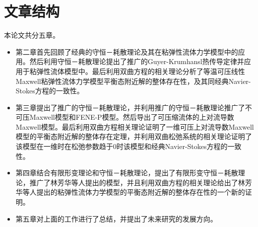 \section{文章结构}
本论文共分五章。
\begin{itemize}
\item 第二章首先回顾了经典的守恒－耗散理论及其在粘弹性流体力学模型中的应用。然后利用守恒－耗散理论提出了推广的Guyer-Krumhansl热传导定律并应用于粘弹性流体模型中。最后利用双曲方程的相关理论分析了等温可压线性Maxwell粘弹性流体力学模型平衡态附近解的整体存在性，及其同经典Navier-Stokes方程的一致性。
\item 第三章提出了推广的守恒－耗散理论，并利用推广的守恒－耗散理论推广了不可压Maxwell模型和FENE-P模型。然后导出了可压缩流体的上对流导数Maxwell模型。最后利用双曲方程相关理论证明了一维可压上对流导数Maxwell模型的平衡态附近解的整体存在定理，并利用双曲松弛系统的相关理论证明了该模型在一维时在松弛参数趋于$0$时该模型和经典Navier-Stokes方程的一致性。
\item 第四章结合有限形变理论和守恒－耗散理论，提出了有限形变守恒－耗散理论，推广了林芳华等人提出的模型，并且利用双曲方程的相关理论给出了林芳华等人提出的粘弹性流体力学模型的平衡态附近解的整体存在性的一个新的证明。
\item 第五章对上面的工作进行了总结，并提出了未来研究的发展方向。
\end{itemize}






